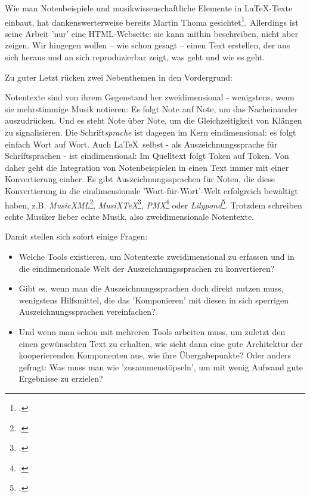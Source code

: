 Wie man Notenbeispiele und musikwissenschaftliche Elemente in \LaTeX-Texte
einbaut, hat dankenswerterweise bereits Martin Thoma
gesichtet\footcite[vgl.][1ff]{Thoma2018a}. Allerdings ist seine Arbeit 'nur'
eine HTML-Webseite: sie kann mithin beschreiben, nicht aber zeigen.
Wir hingegen wollen -- wie schon gesagt -- einen Text erstellen, der aus sich
heraus und an sich reproduzierbar zeigt, was geht und wie es geht.

Zu guter Letzt rücken zwei Nebenthemen in den Vordergrund:

Notentexte sind von ihrem Gegenstand her zweidimensional - wenigstens, wenn sie
mehrstimmige Musik notieren: Es folgt Note auf Note, um das Nacheinander
auszudrücken. Und es steht Note über Note, um die Gleichzeitigkeit von Klängen
zu signalisieren. Die Schrift\emph{sprache} ist dagegen im Kern eindimensional:
es folgt einfach Wort auf Wort. Auch \LaTeX\ selbst - als Auszeichnungssprache
für Schriftsprachen - ist eindimensional: Im Quelltext folgt Token auf Token.
Von daher geht die Integration von Notenbeispielen in einen Text immer mit einer
Konvertierung einher. Es gibt Auszeichnungssprachen für Noten, die diese
Konvertierung in die eindimensionale 'Wort-für-Wort'-Welt erfolgreich bewältigt
haben, z.B. \emph{MusicXML}\footcite[vgl.][\nopage wp]{MusicXML2018a},
\emph{MusiX\TeX}\footcite[vgl.][\nopage wp]{CtanMusixTex2018a},
\emph{PMX}\footcite[vgl.][\nopage wp]{CtanPmx2018a} oder
\emph{Lilypond}\footcite[vgl.][\nopage wp]{Lilypond2018a}. Trotzdem schreiben
echte Musiker lieber echte Musik, also zweidimensionale Notentexte.

Damit stellen sich sofort einige Fragen:

\begin{itemize}
  \item Welche Tools existieren, um Notentexte zweidimensional zu erfassen und
  in die eindimensionale Welt der Auszeichnungssprachen zu konvertieren?
  \item Gibt es, wenn man die Auszeichnungssprachen doch direkt nutzen muss,
  wenigstens Hilfsmittel, die das 'Komponieren' mit diesen in sich sperrigen
  Auszeichnungssprachen vereinfachen?
  \item Und wenn man schon mit mehreren Tools arbeiten muss, um zuletzt den
  einen gewünschten Text zu erhalten, wie sieht dann eine gute Architektur der
  kooperierenden Komponenten aus, wie ihre Übergabepunkte? Oder anders gefragt:
  Was muss man wie 'zusammenstöpseln', um mit wenig Aufwand gute Ergebnisse zu
  erzielen?
\end{itemize}


